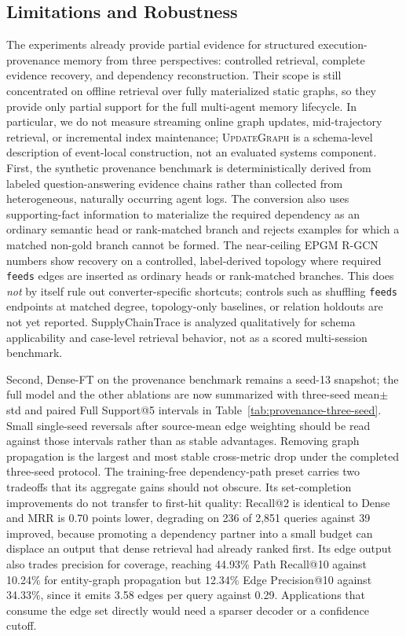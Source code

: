 \subsection{Limitations and Robustness}

The experiments already provide partial evidence for structured
execution-provenance memory from three perspectives: controlled retrieval,
complete evidence recovery, and dependency reconstruction. Their scope is
still concentrated on offline retrieval over fully materialized static
graphs, so they provide only partial support for the full multi-agent
memory lifecycle. In particular, we do not measure streaming online graph
updates, mid-trajectory retrieval, or incremental index maintenance;
\textsc{UpdateGraph} is a schema-level description of event-local
construction, not an evaluated systems component. First, the synthetic
provenance benchmark is deterministically derived from labeled
question-answering evidence chains rather than collected from
heterogeneous, naturally occurring agent logs. The conversion also uses
supporting-fact information to materialize the required dependency as an
ordinary semantic head or rank-matched branch and rejects examples for
which a matched non-gold branch cannot be formed. The near-ceiling EPGM R-GCN numbers show recovery on a controlled,
label-derived topology where required \texttt{feeds} edges are inserted as
ordinary heads or rank-matched branches. This does \emph{not} by itself rule
out converter-specific shortcuts; controls such as shuffling \texttt{feeds}
endpoints at matched degree, topology-only baselines, or relation holdouts
are not yet reported. SupplyChainTrace is analyzed qualitatively for schema applicability and
case-level retrieval behavior, not as a scored multi-session benchmark.

Second, Dense-FT on the provenance benchmark remains a seed-13 snapshot; the
full
model and the other ablations are now summarized with three-seed
mean$\pm$std and paired Full Support@5 intervals in
Table~\ref{tab:provenance-three-seed}. Small single-seed reversals after
source-mean edge weighting should be read against those intervals rather
than as stable advantages. Removing graph propagation is the largest and
most stable cross-metric drop under the completed three-seed protocol.
The training-free dependency-path preset carries two tradeoffs that its
aggregate gains should not obscure. Its set-completion improvements do not
transfer to first-hit quality: Recall@2 is identical to Dense and MRR is
0.70 points lower, degrading on 236 of 2,851 queries against 39 improved,
because promoting a dependency partner into a small budget can displace an
output that dense retrieval had already ranked first. Its edge output also
trades precision for coverage, reaching 44.93\% Path Recall@10 against
10.24\% for entity-graph propagation but 12.34\% Edge Precision@10 against
34.33\%, since it emits 3.58 edges per query against 0.29. Applications
that consume the edge set directly would need a sparser decoder or a
confidence cutoff.

